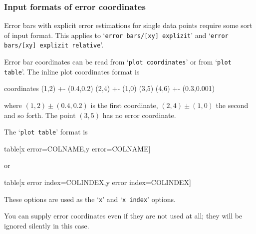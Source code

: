 {\subsubsection{Input formats of error coordinates}
\label{sec:errorbar:input}%
Error bars with explicit error estimations for single data points require some sort of input format. This applies to `\texttt{error bars/[xy] explizit}' and `\texttt{error bars/[xy] explizit relative}'.

Error bar coordinates can be read from `\texttt{plot coordinates}' or from `\texttt{plot table}'. The inline plot coordinates format is
\begin{codeexample}
\addplot coordinates {
	(1,2) +- (0.4,0.2)
	(2,4) +- (1,0)
	(3,5)
	(4,6) +- (0.3,0.001)
}
\end{codeexample}
where $(1,2) \pm (0.4,0.2)$ is the first coordinate, $(2,4) \pm (1,0)$ the second and so forth. The point $(3,5)$ has no error coordinate.

The `\texttt{plot table}' format is
\begin{codeexample}
\addplot table[x error=COLNAME,y error=COLNAME]
\end{codeexample}
or
\begin{codeexample}
\addplot table[x error index=COLINDEX,y error index=COLINDEX]
\end{codeexample}
These options are used as the `\texttt{x}' and `\texttt{x index}' options.

You can supply error coordinates even if they are not used at all; they will be ignored silently in this case.

}%

